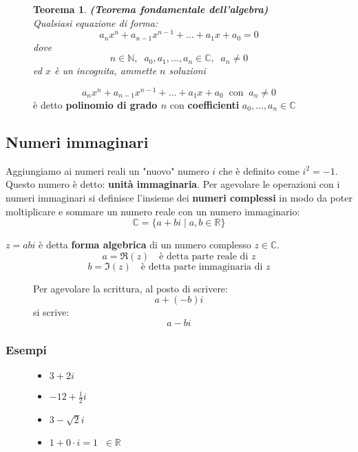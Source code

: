 \documentclass[a4paper]{article}
\newtheorem{theorem}{Teorema}
\theoremstyle{break}
\theoremstyle{break}
\theoremstyle{break}
\theoremstyle{break}
\begin{document}
\begin{figure}[H]
	\begin{theorem}
		\textbf{(Teorema fondamentale dell'algebra)}\\
		Qualsiasi equazione di forma:
		\[
			a_nx^n + a_{n-1}x^{n-1} + \ldots + a_1x + a_0 = 0
		\]
		dove
		\[
			n \in \mathbb{N},\;\; a_0, a_1, \ldots, a_n \in \mathbb{C},\;\; a_n \neq 0
		\]
		ed \( x \) è un incognita, ammette \( n \) soluzioni

	\end{theorem}

	\begin{define}
		\[
			a_nx^n + a_{n-1}x^{n-1} + \ldots + a_1x + a_0 \;\; \text{con} \;\; a_n \neq 0
		\]
		è detto \textbf{polinomio di grado \( n \)} con \textbf{coefficienti} \( a_0, \ldots, a_n \in \mathbb{C} \)
	\end{define}
\end{figure}

\subsection{Numeri immaginari}
Aggiungiamo ai numeri reali un "nuovo" numero $i$ che è definito come $i^2 = -1$. Questo numero
è detto: \textbf{unità immaginaria}. Per agevolare le operazioni con i numeri immaginari si
definisce l'insieme dei \textbf{numeri complessi} in modo da poter moltiplicare e sommare un
numero reale con un numero immaginario:
\[
	\mathbb{C} = \{ a + bi \;|\; a,b \in \mathbb{R} \}
\]

\( z = a bi \) è detta \textbf{forma algebrica} di un numero complesso \( z \in \mathbb{C} \).
\[
	a = \Re(z) \quad \text{è detta parte reale di } z
\]
\[
	b = \Im(z) \quad \text{è detta parte immaginaria di } z
\]

\begin{figure}[H]
	\begin{define}
		Per agevolare la scrittura, al posto di scrivere:
		\[
			a + (-b)i
		\]
		si scrive:
		\[
			a - bi
		\]
	\end{define}
\end{figure}

\subsubsection{Esempi}
\begin{figure}[H]
	\begin{example}
		\begin{itemize}
			\item $3 + 2i$
			\item $-12 + \frac{1}{2}i$
			\item $3-\sqrt{2}i $
			\item $1+0 \cdot i = 1\;\; \in \mathbb{R}$
		\end{itemize}
	\end{example}
\end{figure}
\end{document}
